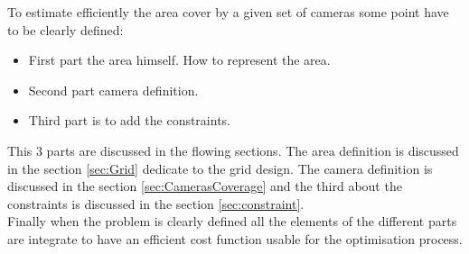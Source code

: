 


To estimate efficiently the area cover by a given set of cameras some point have to be clearly defined: 
\begin{itemize}
\item First part the area himself. How to represent the area. 
\item Second part camera definition. 
\item Third part is to add the constraints. \\
\end{itemize} 
 This 3 parts are discussed in the flowing sections. The area definition is discussed in the section \ref{sec:Grid} dedicate to the grid design. The camera definition is discussed in the section \ref{sec:CamerasCoverage} and the third about the constraints is discussed in the section \ref{sec:constraint}.\\
Finally when the problem is clearly defined all the elements of the different parts are integrate to have an efficient cost function usable for the optimisation process.

   
%
%
% 


